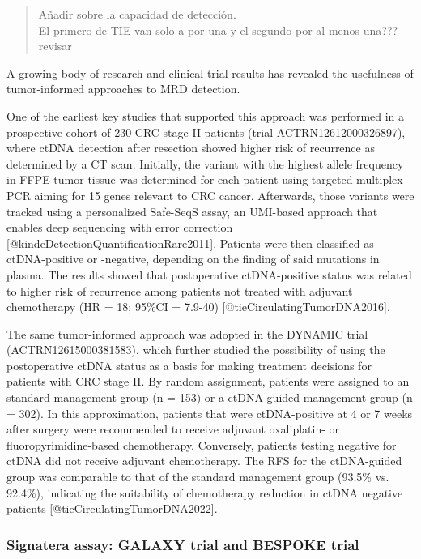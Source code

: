 \documentclass[
]{article}
\begin{document}
\begin{quote}
Añadir sobre la capacidad de detección.\\
El primero de TIE van solo a por una y el segundo por al menos una???
revisar
\end{quote}

A growing body of research and clinical trial results has revealed the
usefulness of tumor-informed approaches to MRD detection.

One of the earliest key studies that supported this approach was
performed in a prospective cohort of 230 CRC stage II patients (trial
ACTRN12612000326897), where ctDNA detection after resection showed
higher risk of recurrence as determined by a CT scan. Initially, the
variant with the highest allele frequency in FFPE tumor tissue was
determined for each patient using targeted multiplex PCR aiming for 15
genes relevant to CRC cancer. Afterwards, those variants were tracked
using a personalized Safe-SeqS assay, an UMI-based approach that enables
deep sequencing with error correction
{[}@kindeDetectionQuantificationRare2011{]}. Patients were then
classified as ctDNA-positive or -negative, depending on the finding of
said mutations in plasma. The results showed that postoperative
ctDNA-positive status was related to higher risk of recurrence among
patients not treated with adjuvant chemotherapy (HR = 18; 95\%CI =
7.9-40) {[}@tieCirculatingTumorDNA2016{]}.

The same tumor-informed approach was adopted in the DYNAMIC trial
(ACTRN12615000381583), which further studied the possibility of using
the postoperative ctDNA status as a basis for making treatment decisions
for patients with CRC stage II. By random assignment, patients were
assigned to an standard management group (n = 153) or a ctDNA-guided
management group (n = 302). In this approximation, patients that were
ctDNA-positive at 4 or 7 weeks after surgery were recommended to receive
adjuvant oxaliplatin- or fluoropyrimidine-based chemotherapy.
Conversely, patients testing negative for ctDNA did not receive adjuvant
chemotherapy. The RFS for the ctDNA-guided group was comparable to that
of the standard management group (93.5\% vs. 92.4\%), indicating the
suitability of chemotherapy reduction in ctDNA negative patients
{[}@tieCirculatingTumorDNA2022{]}.

\subsubsection{Signatera assay: GALAXY trial and BESPOKE
trial}\label{signatera-assay-galaxy-trial-and-bespoke-trial}
\end{document}
